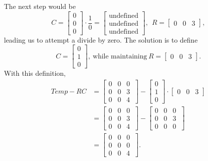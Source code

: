 The next step would be
$$C=  \left[\begin{array}{r} 0 \\ 0 \\ 0 \end{array} \right] \cdot \frac{1}{0} =\left[\begin{array}{r} \text{undefined} \\  \text{undefined} \\  \text{undefined} \end{array} \right] ,~~R=\left[\begin{array}{rrr} 0 & 0 & 3 \end{array} \right],$$
leading us to attempt a divide by zero. The solution is to define
$$C=  \left[\begin{array}{r} 0 \\ 1 \\ 0 \end{array} \right]  ,~\text{while maintaining}~R=\left[\begin{array}{rrr} 0 & 0 & 3 \end{array} \right].$$
With this definition, 
\begin{align*}
    Temp-RC &  =  \left[ \begin{array}{rrr} 0 & 0 & 0\\
 0 & 0& 3 \\0 &0 & 4  \end{array}\ \right] - \left[\begin{array}{r} 0 \\ 1 \\ 0 \end{array} \right] \cdot \left[\begin{array}{rrr} 0 & 0 & 3 \end{array} \right] \\
 &=  \left[ \begin{array}{rrr} 0 & 0 & 0\\
 0 & 0& 3 \\0 &0 & 4  \end{array}\ \right] -  \left[ \begin{array}{rrr} 0 & 0 & 0\\
 0 & 0& 3 \\0 &0 & 0  \end{array}\ \right]\\
 &=\left[ \begin{array}{rrr} 0 & 0 & 0\\
 0 & 0& 0 \\0 &0 & 4  \end{array}\ \right].
\end{align*}
